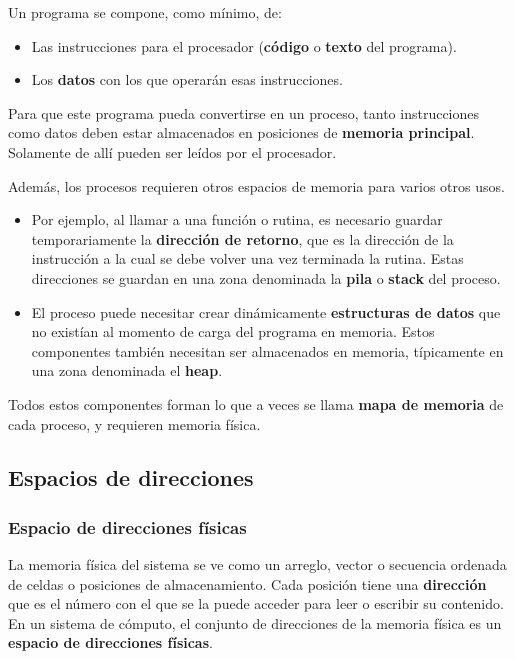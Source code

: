 \documentclass[spanish,A4,]{article}
\begin{document}
Un programa se compone, como mínimo, de:

\begin{itemize}
\itemsep1pt\parskip0pt
\item
  Las instrucciones para el procesador (\textbf{código} o \textbf{texto}
  del programa).
\item
  Los \textbf{datos} con los que operarán esas instrucciones.
\end{itemize}

Para que este programa pueda convertirse en un proceso, tanto
instrucciones como datos deben estar almacenados en posiciones de
\textbf{memoria principal}. Solamente de allí pueden ser leídos por el
procesador.

Además, los procesos requieren otros espacios de memoria para varios
otros usos.

\begin{itemize}
\itemsep1pt\parskip0pt
\item
  Por ejemplo, al llamar a una función o rutina, es necesario guardar
  temporariamente la \textbf{dirección de retorno}, que es la dirección
  de la instrucción a la cual se debe volver una vez terminada la
  rutina. Estas direcciones se guardan en una zona denominada la
  \textbf{pila} o \textbf{stack} del proceso.
\item
  El proceso puede necesitar crear dinámicamente \textbf{estructuras de
  datos} que no existían al momento de carga del programa en memoria.
  Estos componentes también necesitan ser almacenados en memoria,
  típicamente en una zona denominada el \textbf{heap}.
\end{itemize}

Todos estos componentes forman lo que a veces se llama \textbf{mapa de
memoria} de cada proceso, y requieren memoria física.

\subsection{Espacios de direcciones}\label{espacios-de-direcciones}

\subsubsection{Espacio de direcciones
físicas}\label{espacio-de-direcciones-fuxedsicas}

La memoria física del sistema se ve como un arreglo, vector o secuencia
ordenada de celdas o posiciones de almacenamiento. Cada posición tiene
una \textbf{dirección} que es el número con el que se la puede acceder
para leer o escribir su contenido. En un sistema de cómputo, el conjunto
de direcciones de la memoria física es un \textbf{espacio de direcciones
físicas}.
\end{document}

